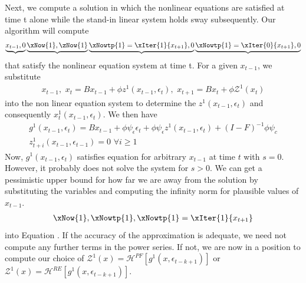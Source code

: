 \documentclass[12pt]{article}
\begin{document}
Next, we compute a solution in which the nonlinear equations are satisfied at time t alone while the stand-in linear system holds sway subsequently.
Our algorithm will  compute
\begin{gather}
\underbrace{x_{t-1},0} 
\underbrace{\xNow{1},\zNow{1}}
\underbrace{\xNowtp{1}=\xIter{1}{x_{t+1}},0}
\underbrace{\xNowtp{1}=\xIter{0}{x_{t+1}},0}
\end{gather}
that satisfy the nonlinear equation system at time t.
For a given $x_{t-1}$, we substitute
\begin{gather}
x_{t-1}, \,\,
  x_t=B x_{t-1} + \phi z^1(x_{t-1},\epsilon_t) , \,\,
  x_{t+1}=B x_{t} + \phi \mathcal{Z}^1(x_t)
\end{gather}
into the non linear equation system to determine the 
$z^1(x_{t-1},\epsilon_t)$ and consequently $x_t^1(x_{t-1},\epsilon_t)$.
We then have
 \begin{gather}
 g^1(x_{t-1},\epsilon_{t})=  
B x_{t-1}+ \phi \psi_\epsilon\epsilon_{t} +
\phi \psi_\epsilon z^1(x_{t-1},\epsilon_t)+
 (I - F)^{-1} \phi \psi_c\\ \label{firstIter}
z^{1}_{t+i}(x_{t-1},\epsilon_{t-1})=0 \,\, \forall i \ge 1
 \end{gather}
Now, $g^1(x_{t-1},\epsilon_{t})$
satisfies equation  for arbitrary $x_{t-1}$ at time $t$ with $s=0$.  However, it probably does not solve the system for $s>0$.
We can get a pessimistic upper bound for how far we are away from the solution 
by substituting the variables and computing the infinity norm for plausible values of $x_{t-1}$.
\begin{gather}
\xNow{1},\xNowtp{1},\xNowtp{1}=\xIter{1}{x_{t+1}}
\end{gather}
into Equation . If the accuracy of the approximation is adequate, we need not compute any further  terms in the power series.  If not,
we are now in a position to compute our choice of
$\mathcal{Z}^1(x)=\mathcal{H}^{PF}[g^{1}(x,\epsilon_{t-k+1})]$ or
$\mathcal{Z}^1(x)=\mathcal{H}^{RE}[g^{1}(x,\epsilon_{t-k+1})]$.

\end{document}
